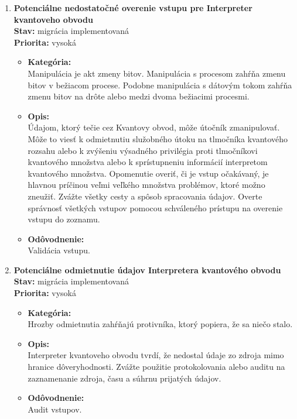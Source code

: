 \begin{enumerate}
\item \textbf{Potenciálne nedostatočné overenie vstupu pre Interpreter kvantoveho obvodu} \\
\textbf{Stav:} migrácia implementovaná \\
\textbf{Priorita:} vysoká

\begin{itemize}
\item[] \textbf{Kategória:} \\
Manipulácia je akt zmeny bitov. Manipulácia s procesom zahŕňa zmenu bitov v bežiacom procese. Podobne manipulácia s dátovým tokom zahŕňa zmenu bitov na drôte alebo medzi dvoma bežiacimi procesmi.
\item[] \textbf{Opis:} \\
Údajom, ktorý tečie cez Kvantovy obvod, môže útočník zmanipulovať. Môže to viesť k odmietnutiu služobného útoku na tlmočníka kvantového rozsahu alebo k zvýšeniu výsadného privilégia proti tlmočníkovi kvantového množstva alebo k sprístupneniu informácií interpretom kvantového množstva. Opomenutie overiť, či je vstup očakávaný, je hlavnou príčinou veľmi veľkého množstva problémov, ktoré možno zneužiť. Zvážte všetky cesty a spôsob spracovania údajov. Overte správnosť všetkých vstupov pomocou schváleného prístupu na overenie vstupu do zoznamu.
\item[] \textbf{Odôvodnenie:} \\
Validácia vstupu.
\end{itemize}

\item \textbf{Potenciálne odmietnutie údajov Interpretera kvantového obvodu} \\
\textbf{Stav:} migrácia implementovaná \\
\textbf{Priorita:} vysoká

\begin{itemize}
\item[] \textbf{Kategória:} \\
Hrozby odmietnutia zahŕňajú protivníka, ktorý popiera, že sa niečo stalo.
\item[] \textbf{Opis:} \\
Interpreter kvantoveho obvodu tvrdí, že nedostal údaje zo zdroja mimo hranice dôveryhodnosti. Zvážte použitie protokolovania alebo auditu na zaznamenanie zdroja, času a súhrnu prijatých údajov.
\item[] \textbf{Odôvodnenie:} \\
Audit vstupov.
\end{itemize}


\end{enumerate}
